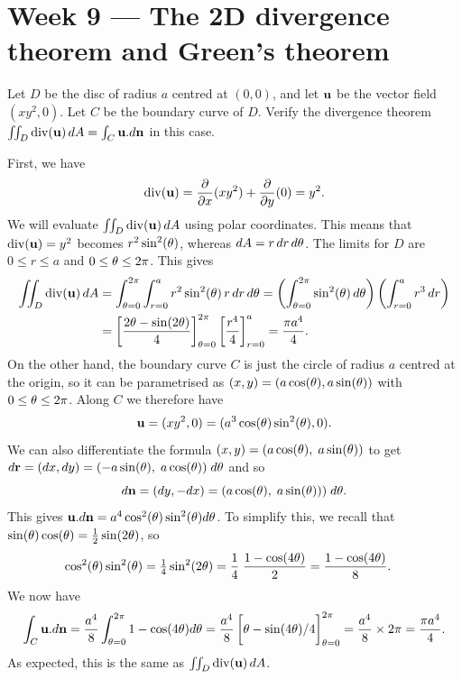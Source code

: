 \documentclass[a4paper]{amsart}
\renewenvironment{solution}{\SolutionInline}{\endSolutionInline}
\begin{document}
\section*{Week 9 ---
 The 2D divergence theorem and Green's theorem
}

\begin{exercise}
 Let $D$ be the disc of radius $a$ centred at $(0,0)$, and let $\mathbf{u}$
 be the vector field $(xy^2,0)$.  Let $C$ be the boundary curve of
 $D$.  Verify the divergence theorem
 $\iint_D\operatorname{div}(\mathbf{u})\,dA=\int_C\mathbf{u}.d\mathbf{n}$ in this case.
\end{exercise}
\begin{solution}
 First, we have
 \[ \operatorname{div}(\mathbf{u}) = \frac{\partial}{\partial x}(xy^2) + \frac{\partial}{\partial y}(0) = y^2. \]
 We will evaluate $\iint_D\operatorname{div}(\mathbf{u})\,dA$ using polar coordinates.  This
 means that $\operatorname{div}(\mathbf{u})=y^2$ becomes $r^2\sin^2(\theta)$, whereas
 $dA=r\,dr\,d\theta$.  The limits for $D$ are $0\leq r\leq a$ and
 $0\leq\theta\leq 2\pi$.  This gives
 \begin{align*}
  \iint_D\dv(\vu)\,dA 
   &= \int_{\tht=0}^{2\pi}\int_{r=0}^a r^2\sin^2(\tht)\,r\,dr\,d\tht 
    = \left(\int_{\tht=0}^{2\pi}\sin^2(\tht)\,d\tht\right)
      \left(\int_{r=0}^a r^3\,dr\right) \\
   &= \CH{\frac{2\tht-\sin(2\tht)}{4}}_{\tht=0}^{2\pi}
      \CH{\frac{r^4}{4}}_{r=0}^a 
    = \frac{\pi a^4}{4}.
 \end{align*}
 On the other hand, the boundary curve $C$ is just the circle of
 radius $a$ centred at the origin, so it can be parametrised as
 $(x,y)=(a\cos(\theta),a\sin(\theta))$ with $0\leq\theta\leq 2\pi$.  Along
 $C$ we therefore have
 \[ \mathbf{u}=(xy^2,0)=(a^3\cos(\theta)\sin^2(\theta),0). \]
 We can also differentiate the formula
 $(x,y)=(a\cos(\theta),\;a\sin(\theta))$ to get 
 $d\mathbf{r}=(dx,dy)=(-a\sin(\theta),\;a\cos(\theta))\;d\theta$ and so 
 \[ d\mathbf{n} = (dy,-dx) = (a\cos(\theta),\;a\sin(\theta)))\;d\theta. \]
 This gives $\mathbf{u}.d\mathbf{n}=a^4\cos^2(\theta)\sin^2(\theta)d\theta$.  To simplify
 this, we recall that $\sin(\theta)\cos(\theta)=\tfrac{1}{2}\sin(2\theta)$, so 
 \begin{align*}
  \cos^2(\theta)\sin^2(\theta) 
   &= \tfrac{1}{4}\sin^2(2\theta) 
    = \frac{1}{4} \; \frac{1-\cos(4\theta)}{2} 
    = \frac{1-\cos(4\theta)}{8}.
 \end{align*}
 We now have
 \[ \int_C\vu.d\vn =
     \frac{a^4}{8} \int_{\tht=0}^{2\pi} 1-\cos(4\tht) d\tht = 
     \frac{a^4}{8} \CH{\tht-\sin(4\tht)/4}_{\tht=0}^{2\pi} = 
     \frac{a^4}{8}\tm 2\pi = \frac{\pi a^4}{4}.
 \]
 As expected, this is the same as $\iint_D\operatorname{div}(\mathbf{u})\,dA$.
\end{solution}
\end{document}
